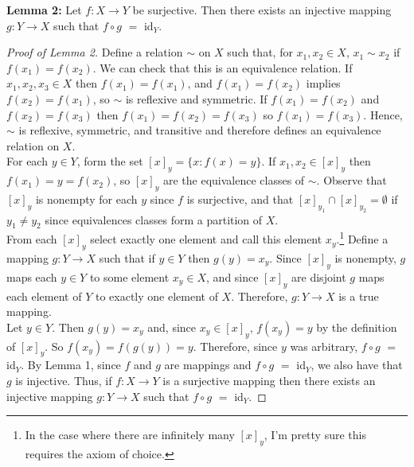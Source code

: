 \documentclass[]{book}
\begin{document}
{\bf Lemma 2:} Let $f:X\to Y$ be surjective. Then there exists an injective mapping $g:Y\to X$ such that $f \circ g$ $=$ id$_Y$.
\begin{proof}[Proof of Lemma 2]
Define a relation $\sim$ on $X$ such that, for $x_1,x_2\in X$, $x_1\sim x_2$ if $f(x_1)=f(x_2)$. We can check that this is an equivalence relation. If $x_1,x_2,x_3\in X$ then $f(x_1)=f(x_1)$, and $f(x_1)=f(x_2)$ implies $f(x_2)=f(x_1)$, so $\sim$ is reflexive and symmetric. If $f(x_1)=f(x_2)$ and $f(x_2)=f(x_3)$ then $f(x_1)=f(x_2)=f(x_3)$ so $f(x_1)=f(x_3)$. Hence, $\sim$ is reflexive, symmetric, and transitive and therefore defines an equivalence relation on $X$. \\ 
For each $y\in Y$, form the set $[x]_y = \{x: f(x)=y\}$. If $x_1,x_2\in [x]_y$ then $f(x_1)=y=f(x_2)$, so $[x]_y$ are the equivalence classes of $\sim$. Observe that $[x]_y$ is nonempty for each $y$ since $f$ is surjective, and that $[x]_{y_1}\cap [x]_{y_2} =\emptyset$ if $y_1\neq y_2$ since equivalences classes form a partition of $X$. \\
From each $[x]_y$ select exactly one element and call this element $x_y$.\footnote{In the case where there are infinitely many $[x]_y$, I'm pretty sure this requires the axiom of choice.} Define a mapping $g:Y\to X$ such that if $y\in Y$ then $g(y)=x_y$. Since $[x]_y$ is nonempty, $g$ maps each $y\in Y$ to some element $x_y\in X$, and since $[x]_y$ are disjoint $g$ maps each element of $Y$ to exactly one element of $X$. Therefore, $g:Y\to X$ is a true mapping. \\
Let $y\in Y$. Then $g(y) = x_y$ and, since $x_y\in [x]_y$, $f(x_y)=y$ by the definition of $[x]_y$. So $f(x_y)=f(g(y))=y$. Therefore, since $y$ was arbitrary, $f \circ g$ $=$ id$_Y$. By Lemma 1, since $f$ and $g$ are mappings and $f \circ g$ $=$ id$_Y$, we also have that $g$ is injective. Thus, if $f:X\to Y$ is a surjective mapping then there exists an injective mapping $g:Y\to X$ such that $f \circ g$ $=$ id$_Y$.
\end{proof}
\end{document}
